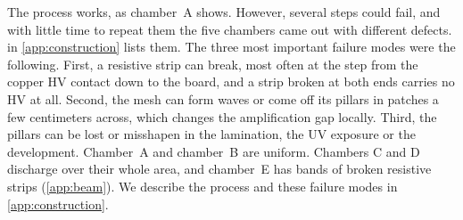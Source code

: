 The process works, as chamber~A shows. However, several steps could fail, and with little time to repeat them the
five chambers came out with different defects.  in \cref{app:construction} lists them. The three
most important failure modes were the following. First, a resistive strip can break, most often at the step from the
copper HV contact down to the board, and a strip broken at both ends carries no HV at all. Second, the mesh can form
waves or come off its pillars in patches a few centimeters across, which changes the amplification gap locally. Third,
the pillars can be lost or misshapen in the lamination, the UV exposure or the development. Chamber~A and chamber~B are
uniform. Chambers C and D discharge over their whole area, and chamber~E has bands of broken resistive strips
(\cref{app:beam}). We describe the process and these failure modes in \cref{app:construction}.
